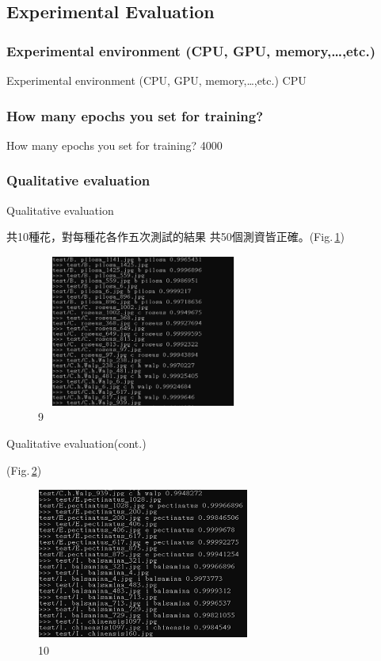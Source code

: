 \documentclass{beamer}
\begin{document}
\subsection{Experimental Evaluation }
\subsubsection{Experimental environment (CPU, GPU, memory,…,etc.)}
\begin{frame}{Experimental environment (CPU, GPU, memory,…,etc.)}
CPU
\end{frame}

\subsubsection{How many epochs you set for training?}
\begin{frame}{How many epochs you set for training?}
4000
\end{frame}

\subsubsection{Qualitative evaluation}
\begin{frame}{Qualitative evaluation}
\begin{CJK}{UTF8}{bkai}
\small 共10種花，對每種花各作五次測試的結果 共50個測資皆正確。(Fig.\,\ref{fig:9})
 \end{CJK}
 \begin{figure}
    \includegraphics[width=7cm,height=5cm]{Qualitative(1).png}
    \caption{9}
    \label{fig:9}
  \end{figure}
\end{frame}


\begin{frame}{Qualitative evaluation(cont.)}
\begin{CJK}{UTF8}{bkai}
(Fig.\,\ref{fig:10})
\end{CJK}
 \begin{figure}
    \includegraphics[width=7cm,height=5cm]{Qualitative(2).png}
    \caption{10}
    \label{fig:10}
  \end{figure}
\end{frame}
\end{document}
